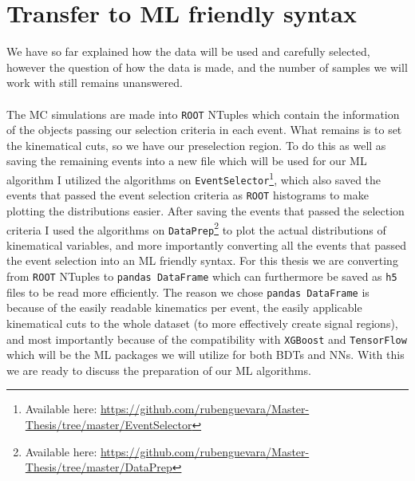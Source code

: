 \documentclass[12pt, a4paper]{book}
\begin{document}
\section{Transfer to ML friendly syntax}
We have so far explained how the data will be used and carefully selected, however the question of how the data is made, and the number of samples we will work with still remains unanswered. \\
\\The MC simulations are made into \verb|ROOT| \cite{ROOT} NTuples which contain the information of the objects passing our selection criteria in each event. What remains is to set the kinematical cuts, so we have our preselection region. 
To do this as well as saving the remaining events into a new file which will be used for our ML algorithm I utilized the algorithms on \verb|EventSelector|\footnote{Available here: \href{https://github.com/rubenguevara/Master-Thesis/tree/master/EventSelector}{https://github.com/rubenguevara/Master-Thesis/tree/master/EventSelector}}, 
which also saved the events that passed the event selection criteria as \verb|ROOT| histograms to make plotting the distributions easier. After saving the events that passed the selection criteria I used the algorithms on \verb|DataPrep|\footnote{Available here: \href{https://github.com/rubenguevara/Master-Thesis/tree/master/DataPrep}{https://github.com/rubenguevara/Master-Thesis/tree/master/DataPrep}} 
to plot the actual distributions of kinematical variables, and more importantly converting all the events that passed the event selection into an ML friendly syntax. For this thesis we are converting from \verb|ROOT| NTuples to \verb|pandas DataFrame| \cite{pd.DataFrame} 
which can furthermore be saved as \verb|h5| files to be read more efficiently. The reason we chose \verb|pandas DataFrame| is because of the easily readable kinematics per event, the easily applicable kinematical cuts to the whole dataset 
(to more effectively create signal regions), and most importantly because of the compatibility with \verb|XGBoost| \cite{XGBoost} and \verb|TensorFlow| \cite{TensorFlow} which will be the ML packages we will utilize for both BDTs and NNs. 
With this we are ready to discuss the preparation of our ML algorithms.

\end{document}
